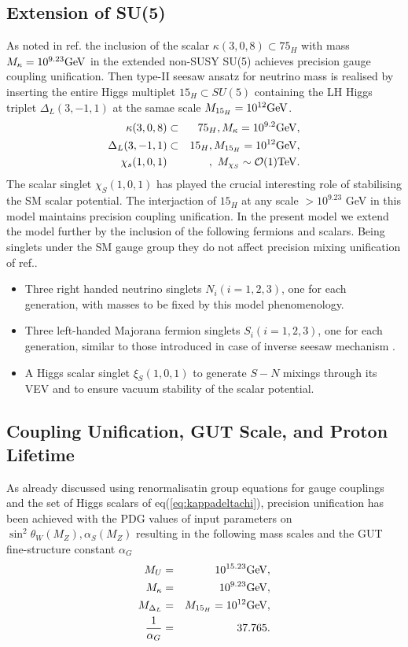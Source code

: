 \documentclass[a4paper,11pt]{article}
\newcommand{\bea}{\begin{eqnarray}}
\newcommand{\eea}{\end{eqnarray}}
\begin{document}
\subsection{Extension of SU(5)}
As noted in ref.\cite{kynshi-mkp:1993} the inclusion of
the scalar $\kappa(3,0,8)\subset {75}_H$ with mass
$M_{\kappa}=10^{9.23} {\rm GeV}$  in the extended non-SUSY SU(5)
achieves precision gauge coupling unification. Then 
  type-II seesaw ansatz for neutrino mass is realised by inserting the
  entire Higgs multiplet ${15}_H\subset SU(5)$ containing the LH Higgs triplet
  $\Delta_L(3,-1, 1)$ at the samae scale $ M_{15_H}=10^{12}{\rm GeV}$.
\bea
\kappa(3,0,8)&\subset&{75}_H, M_{\kappa}=10^{9.2} {\rm GeV},\nonumber\\
\Delta_L(3,-1, 1)&\subset& {15}_H, M_{15_H}=10^{12}{\rm GeV},\nonumber\\
\chi_s(1,0,1)&&,~ M_{\chi_S} \sim {\cal O} (1) {\rm TeV}.\label{eq:kappadeltachi}
\eea
The scalar singlet $\chi_S(1,0,1)$ has played the
crucial interesting role of stabilising the SM scalar potential.
The interjaction of ${15}_H$ at any scale $> 10^{9.23}$ GeV in this
model maintains precision coupling unification.
In the present  model we extend the model further by the inclusion of the
following fermions and scalars. Being singlets under the SM gauge group
they do not affect precision mixing unification  of
ref.\cite{scp:2018}.   
\begin{itemize}
\item{Three right handed neutrino singlets $N_i(i=1,2,3)$,  one for
  each generation, with  masses to be fixed by this model phenomenology.}
\item{Three left-handed Majorana fermion singlets $S_i(i=1,2,3)$, 
one for each generation,  similar to those introduced in case of
inverse seesaw mechanism \cite{inv1,inv2,inv3,inv4,inv5,inv6,inv7}.}
\item{A Higgs scalar singlet $\xi_S(1,0,1)$  
  to generate $S-N$ mixings through its VEV and to ensure vacuum
  stability of the scalar potential.}
\end{itemize}

\subsection{Coupling Unification, GUT Scale, and Proton Lifetime}
As already discussed \cite{scp:2018,kynshi-mkp:1993} using renormalisatin group equations for gauge couplings and the set of  Higgs scalars of eq(\ref{eq:kappadeltachi}),
precision unification has been achieved with the PDG values of input parameters
\cite{PDG:2012,PDG:2014,PDG:2016} on $\sin^2\theta_W(M_Z),\alpha_S(M_Z)$ resulting in the following 
mass scales and  the GUT
fine-structure constant $\alpha_G$ 
\bea
M_U&=& 10^{15.23} {\rm GeV}     , \nonumber\\
M_{\kappa}&=& 10^{9.23} {\rm GeV}, \nonumber\\
M_{\Delta_L}&=& M_{{15}_H}=10^{12} {\rm GeV},\nonumber\\
\frac{1}{\alpha_G}&=& 37.765. \label{eq:solsu5}
\eea
\end{document}
